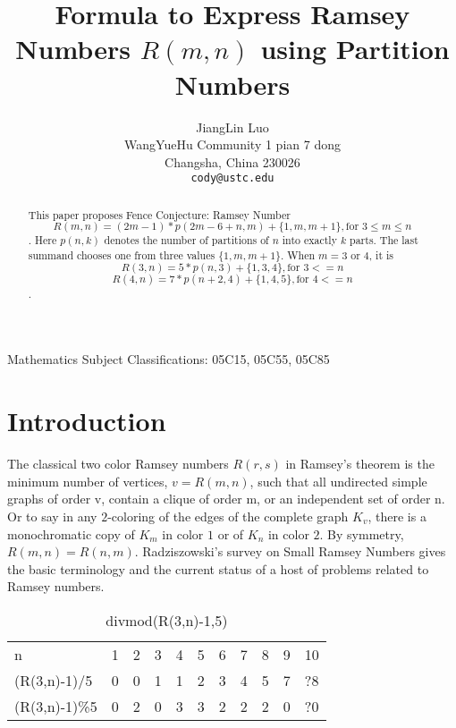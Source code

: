 \documentclass[12pt]{article}
\begin{document}
\title{Formula to Express Ramsey Numbers $R(m,n)$ using Partition Numbers}

\author{
JiangLin Luo \\
\small WangYueHu Community 1 pian 7 dong \\[-0.8ex]
\small Changsha, China 230026 \\
\small\tt cody@ustc.edu \\
}

\maketitle

\begin{center}
\small{Mathematics Subject Classifications: 05C15, 05C55, 05C85}
\end{center}

\begin{abstract}
This paper proposes Fence Conjecture: Ramsey Number 
\[R(m,n)=(2m-1)*p(2m-6+n,m)+\{1,m,m+1\}, \text{for } 3\leq m\leq n\]. 
Here $p(n,k)$ denotes the number of partitions of $n$ into exactly $k$ parts. The last summand chooses one from three values $\{1,m,m+1\}$.
When $m=3 \text{ or }4$, it is 
\[R(3,n)=5*p(n,3)+\{1,3,4\}, \text{for } 3<=n\] 
\[R(4,n)=7*p(n+2,4)+\{1,4,5\}, \text{for } 4<=n\] .
\end{abstract}

\section{Introduction}

The classical two color Ramsey numbers $R(r, s)$ in Ramsey's theorem is the minimum number of vertices, 
$v = R(m, n)$, such that all undirected simple graphs of order v, contain a clique of order m, or an independent set of order n.
Or to say in any $2$-coloring of the edges of the complete graph $K_v$, there
is a monochromatic copy of $K_m$ in color $1$ or of $K_n$ in color $2$.
By symmetry, $R(m, n) = R(n, m)$.
Radziszowski's survey on Small Ramsey Numbers \cite{survey} gives the basic terminology and
the current status of a host of problems related to Ramsey numbers. 

\begin{table}[]
  \caption{divmod(R(3,n)-1,5)}
  \label{tab:divmodR3n1}
  \begin{tabular}{lllllllllll}
  n             & 1 & 2 & 3 & 4 & 5 & 6 & 7 & 8 & 9 & 10 \\
  (R(3,n)-1)/5  & 0 & 0 & 1 & 1 & 2 & 3 & 4 & 5 & 7 & ?8 \\
  (R(3,n)-1)\%5 & 0 & 2 & 0 & 3 & 3 & 2 & 2 & 2 & 0 & ?0
  \end{tabular}
\end{table}
\end{document}
